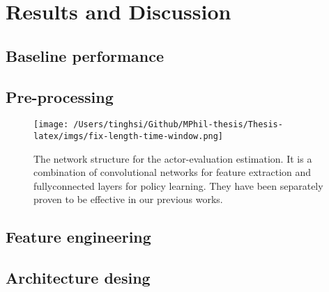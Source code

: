 \chapter{Results and Discussion}
\section{Baseline performance}
\section{Pre-processing}

\begin{figure}[!t]
    \centering
    \texttt{[image: /Users/tinghsi/Github/MPhil-thesis/Thesis-latex/imgs/fix-length-time-window.png]}
    \caption{The network structure for the actor-evaluation estimation. It is a combination of convolutional networks for feature extraction and fullyconnected layers for policy learning. They have been separately proven to be effective in our previous works.}
    \label{fig:ob_network_structure}
 \end{figure}


\section{Feature engineering}
\section{Architecture desing}
